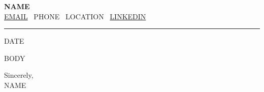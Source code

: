 \documentclass[11pt,letterpaper]{extarticle}
\begin{document}
\noindent
{\LARGE \textbf{{{NAME}}}}\\[4pt]
\footnotesize
\href{mailto:{{EMAIL}}}{{{EMAIL}}}
\textbullet\ {{PHONE}}
\textbullet\ {{LOCATION}}
\textbullet\ \href{https://{{LINKEDIN}}}{{{LINKEDIN}}}\\[-4pt]
\hrule
\normalsize
\vspace{14pt}

{{DATE}}

\vspace{4pt}


\vspace{6pt}

{{BODY}}

\vspace{8pt}
Sincerely,\\
{{NAME}}
\end{document}
